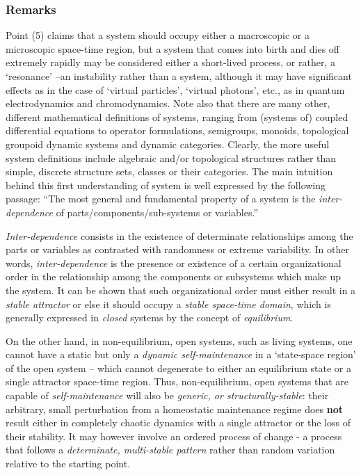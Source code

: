 \documentclass[12pt]{article}
\theoremstyle{plain}
\theoremstyle{definition}
\numberwithin{equation}{section}
\begin{document}
\subsubsection{Remarks}
 Point (5) claims that a system should occupy either a macroscopic or a microscopic space-time region, but a system that comes into birth and dies off extremely rapidly may be considered either a short-lived process, or rather, a `resonance' --an instability rather than a system, although it may have significant effects as in the case of 
`virtual particles', `virtual photons', etc., as in quantum electrodynamics and chromodynamics. Note also that there are many other, different mathematical definitions of systems, ranging from (systems of) coupled differential equations to operator formulations, semigroups, monoids, topological groupoid dynamic systems and dynamic categories. Clearly, the more useful system definitions include algebraic and/or topological structures rather than simple, discrete structure sets, classes or their categories. The main intuition behind this first understanding of system is well expressed by the following passage: ``The most general and fundamental property of a system is the 
\emph{inter-dependence} of parts/components/sub-systems or variables.''

 \emph{Inter-dependence} consists in the existence of determinate relationships among the parts or variables as contrasted with randomness or extreme variability. In other words, \emph{inter-dependence} is the presence or existence of a certain organizational order in the relationship among the components or subsystems which make up the system. It can be shown that such organizational order must either result in a \emph{stable attractor} or else it should occupy a \emph{stable space-time domain}, which is generally expressed in \emph{closed} systems by the concept of 
\emph{equilibrium}. 

 On the other hand, in non-equilibrium, open systems, such as living systems, one cannot have a static but only a \emph{dynamic self-maintenance} in a `state-space region' of the open system -- which cannot degenerate to either an equilibrium state or a single attractor space-time region. Thus, non-equilibrium, open systems that are capable of \emph{self-maintenance} will also be \emph{generic, or structurally-stable}: their arbitrary, small perturbation from a homeostatic maintenance regime does \textbf{not} result either in completely chaotic dynamics with a single attractor or the loss of their stability. It may however involve an ordered process of change - a process that follows a \emph{determinate, multi-stable pattern} rather than random variation relative to the starting point. 
\end{document}
